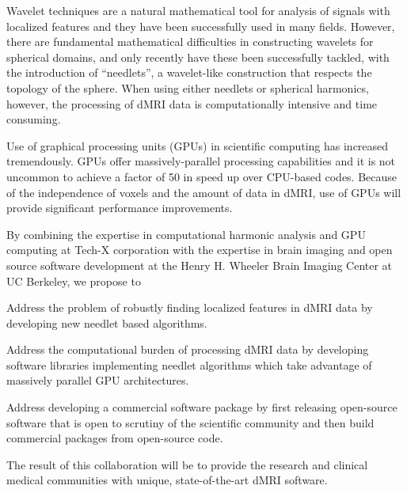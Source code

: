 \documentclass[10pt]{article}
\begin{document}
Wavelet techniques are a natural mathematical tool for analysis of signals with
localized features and they have been successfully used in many fields. However, there
are fundamental mathematical difficulties in constructing wavelets for spherical
domains, and only recently have these been successfully tackled, with the
introduction of ``needlets'', a wavelet-like construction that respects the
topology of the sphere. When using either needlets or spherical harmonics, however, the 
processing of dMRI data is computationally intensive and time consuming.

Use of graphical processing units (GPUs) in scientific computing has
increased tremendously. GPUs offer massively-parallel processing capabilities
and it is not uncommon to achieve a factor of 50 in speed up over CPU-based
codes. Because of the independence of voxels and the amount of data in
dMRI, use of GPUs will provide significant performance improvements.

By combining the expertise in computational harmonic analysis and GPU computing
at Tech-X corporation with the expertise in brain imaging and open source software
development at the Henry H. Wheeler Brain Imaging Center at UC Berkeley, we propose to
\begin{itemize*}
\item{Address the problem of robustly finding localized features in dMRI data by developing new
      needlet based algorithms.}
\item{Address the computational burden of processing dMRI data by developing software
     libraries implementing needlet algorithms which take advantage of massively parallel GPU architectures.}
\item{Address developing a commercial software package by first releasing open-source software that is open to scrutiny
      of the scientific community and then build commercial packages from open-source code.}
\end{itemize*}
The result of this collaboration will be to provide the research and clinical
medical communities with unique, state-of-the-art dMRI software.

\vspace{-8pt}
\end{document}
